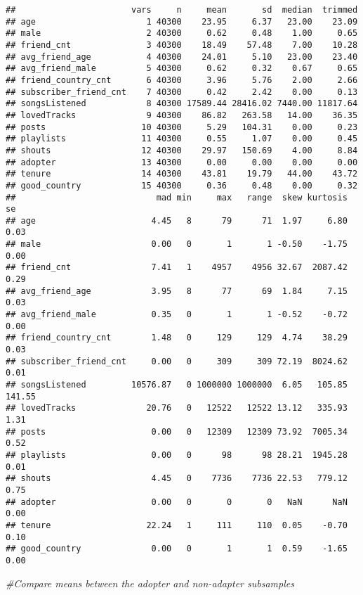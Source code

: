 \documentclass[]{article}
\newenvironment{Shaded}{\begin{snugshade}}{\end{snugshade}}
\newcommand{\CommentTok}[1]{\textcolor[rgb]{0.56,0.35,0.01}{\textit{#1}}}
\begin{document}
\begin{verbatim}
##                       vars     n     mean       sd  median  trimmed
## age                      1 40300    23.95     6.37   23.00    23.09
## male                     2 40300     0.62     0.48    1.00     0.65
## friend_cnt               3 40300    18.49    57.48    7.00    10.28
## avg_friend_age           4 40300    24.01     5.10   23.00    23.40
## avg_friend_male          5 40300     0.62     0.32    0.67     0.65
## friend_country_cnt       6 40300     3.96     5.76    2.00     2.66
## subscriber_friend_cnt    7 40300     0.42     2.42    0.00     0.13
## songsListened            8 40300 17589.44 28416.02 7440.00 11817.64
## lovedTracks              9 40300    86.82   263.58   14.00    36.35
## posts                   10 40300     5.29   104.31    0.00     0.23
## playlists               11 40300     0.55     1.07    0.00     0.45
## shouts                  12 40300    29.97   150.69    4.00     8.84
## adopter                 13 40300     0.00     0.00    0.00     0.00
## tenure                  14 40300    43.81    19.79   44.00    43.72
## good_country            15 40300     0.36     0.48    0.00     0.32
##                            mad min     max   range  skew kurtosis     se
## age                       4.45   8      79      71  1.97     6.80   0.03
## male                      0.00   0       1       1 -0.50    -1.75   0.00
## friend_cnt                7.41   1    4957    4956 32.67  2087.42   0.29
## avg_friend_age            3.95   8      77      69  1.84     7.15   0.03
## avg_friend_male           0.35   0       1       1 -0.52    -0.72   0.00
## friend_country_cnt        1.48   0     129     129  4.74    38.29   0.03
## subscriber_friend_cnt     0.00   0     309     309 72.19  8024.62   0.01
## songsListened         10576.87   0 1000000 1000000  6.05   105.85 141.55
## lovedTracks              20.76   0   12522   12522 13.12   335.93   1.31
## posts                     0.00   0   12309   12309 73.92  7005.34   0.52
## playlists                 0.00   0      98      98 28.21  1945.28   0.01
## shouts                    4.45   0    7736    7736 22.53   779.12   0.75
## adopter                   0.00   0       0       0   NaN      NaN   0.00
## tenure                   22.24   1     111     110  0.05    -0.70   0.10
## good_country              0.00   0       1       1  0.59    -1.65   0.00
\end{verbatim}

\begin{Shaded}
\begin{Highlighting}[]
\CommentTok{#Compare means between the adopter and non-adapter subsamples}
\end{Highlighting}
\end{Shaded}
\end{document}
